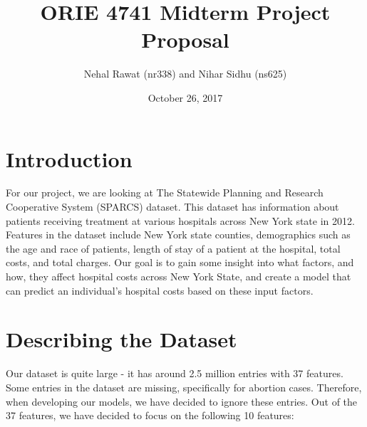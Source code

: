 \documentclass{article}
\title{ORIE 4741 Midterm Project Proposal}
\author{Nehal Rawat (nr338) and Nihar Sidhu (ns625) }
\date{October 26, 2017}
\begin{document}
\maketitle

\section{Introduction}
For our project, we are looking at The Statewide Planning and Research Cooperative System (SPARCS) dataset. This dataset has information about patients receiving treatment at various hospitals across New York state in 2012. Features in the dataset include New York state counties, demographics such as the age and race of patients, length of stay of a patient at the hospital, total costs, and total charges. Our goal is to gain some insight into what factors, and how, they affect hospital costs across New York State, and create a model that can predict an individual’s hospital costs based on these input factors. 

\section{Describing the Dataset}
Our dataset is quite large - it has around 2.5 million entries with 37 features. Some entries in the dataset are missing, specifically for abortion cases. Therefore, when developing our models, we have decided to ignore these entries. Out of the 37 features, we have decided to focus on the following 10 features: 
\end{document}
